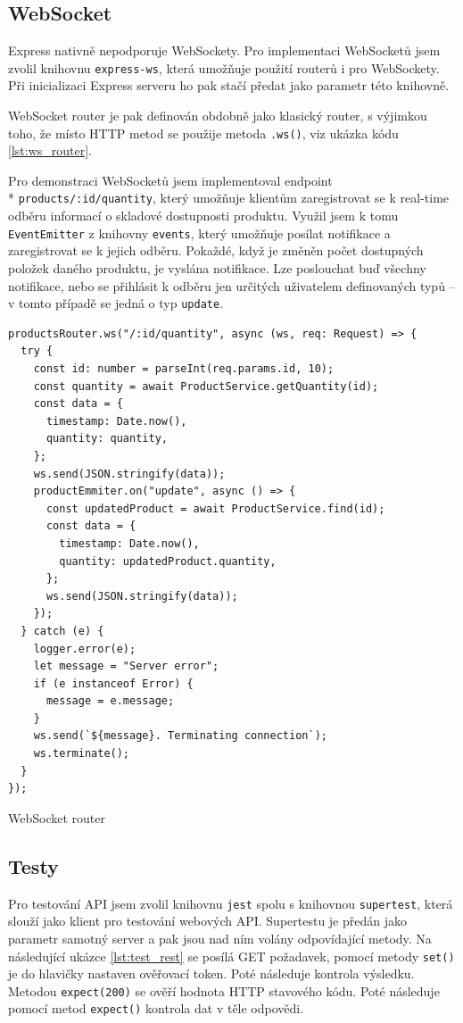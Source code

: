 \documentclass[thesis=M,czech]{FITthesis}[2019/12/23]
\begin{document}
\subsection{WebSocket}
Express nativně nepodporuje WebSockety. Pro implementaci WebSocketů jsem zvolil knihovnu \texttt{express-ws}, která umožňuje použití routerů i pro WebSockety. Při inicializaci Express serveru ho pak stačí předat jako parametr této knihovně.

WebSocket router je pak definován obdobně jako klasický router, s výjimkou toho, že místo HTTP metod se použije metoda \texttt{.ws()}, viz ukázka kódu \ref{lst:ws_router}.

Pro demonstraci WebSocketů jsem implementoval endpoint \\* \texttt{products/:id/quantity}, který umožňuje klientům zaregistrovat se k real-time odběru informací o skladové dostupnosti produktu. Využil jsem k tomu \texttt{EventEmitter} z knihovny \texttt{events}, který umožňuje posílat notifikace a zaregistrovat se k jejich odběru. Pokaždé, když je změněn počet dostupných položek daného produktu, je vyslána notifikace. Lze poslouchat buď všechny notifikace, nebo se přihlásit k odběru jen určitých uživatelem definovaných typů -- v tomto případě se jedná o typ \texttt{update}.

\begin{listing}[h]
\begin{verbatim}
productsRouter.ws("/:id/quantity", async (ws, req: Request) => {
  try {
    const id: number = parseInt(req.params.id, 10);
    const quantity = await ProductService.getQuantity(id);
    const data = {
      timestamp: Date.now(),
      quantity: quantity,
    };
    ws.send(JSON.stringify(data));
    productEmmiter.on("update", async () => {
      const updatedProduct = await ProductService.find(id);
      const data = {
        timestamp: Date.now(),
        quantity: updatedProduct.quantity,
      };
      ws.send(JSON.stringify(data));
    });
  } catch (e) {
    logger.error(e);
    let message = "Server error";
    if (e instanceof Error) {
      message = e.message;
    }
    ws.send(`${message}. Terminating connection`);
    ws.terminate();
  }
});
\end{verbatim}
\caption{WebSocket router}
\label{lst:ws_router}
\end{listing}

\subsection{Testy}
Pro testování API jsem zvolil knihovnu \texttt{jest} spolu s knihovnou \texttt{supertest}, která slouží jako klient pro testování webových API. Supertestu je předán jako parametr samotný server a pak jsou nad ním volány odpovídající metody. Na následující ukázce \ref{lst:test_rest} se posílá GET požadavek, pomocí metody \texttt{set()} je do hlavičky nastaven ověřovací token. Poté následuje kontrola výsledku. Metodou \texttt{expect(200)} se ověří hodnota HTTP stavového kódu. Poté následuje pomocí metod \texttt{expect()} kontrola dat v těle odpovědi.
\end{document}
